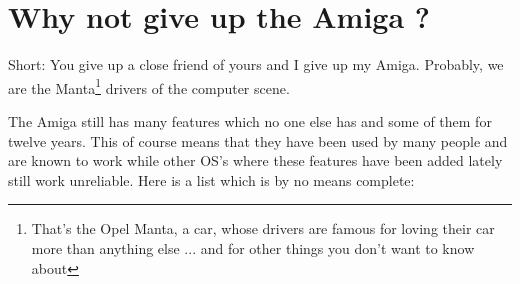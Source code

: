 \section{Why not give up the Amiga ?}

Short: You give up a close friend of yours and I give up my Amiga.
Probably, we are the Manta\footnote{That's the Opel Manta, a car, whose
drivers are famous for loving their car more than anything else ... and for
other things you don't want to know about} drivers of the computer scene.

The Amiga still has many features which no one else has and some of them
for twelve years. This of course means that they have been used by many
people and are known to work while other OS's where these features have been
added lately still work unreliable. Here is a list which is by no means
complete:

